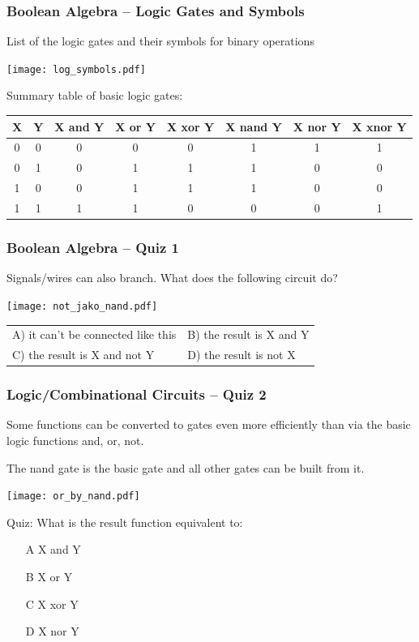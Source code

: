 \documentclass{beamer}
\begin{document}
\begin{frame}
\frametitle{Boolean Algebra -- Logic Gates and Symbols}

List of the logic gates and their symbols for binary operations
\begin{center}
   \texttt{[image: log\_symbols.pdf]}
\end{center}

Summary table of basic logic gates:
\begin{tabular}{|c|c|c|c|c|c|c|c|}\hline
X & Y & X and Y & X or Y & X xor Y & X nand Y & X nor Y & X xnor Y \\\hline
0 & 0 &    0    &   0    &    0    &     1    &    1    &    1     \\\hline
0 & 1 &    0    &   1    &    1    &     1    &    0    &    0     \\\hline
1 & 0 &    0    &   1    &    1    &     1    &    0    &    0     \\\hline
1 & 1 &    1    &   1    &    0    &     0    &    0    &    1     \\\hline
\end{tabular}

\end{frame}


\begin{frame}
\frametitle{Boolean Algebra -- Quiz 1}

Signals/wires can also branch. What does the following circuit do?
\begin{center}
   \texttt{[image: not\_jako\_nand.pdf]}
\end{center}

\begin{tabular}{ll}
A) it can't be connected like this \phantom{XXXX} & B) the result is X and Y\\
C) the result is X and not Y                     & D) the result is not X
\end{tabular}

\end{frame}


\begin{frame}
\frametitle{Logic/Combinational Circuits -- Quiz 2}

Some functions can be converted to gates even more efficiently than via the basic logic functions and, or, not.

The nand gate is the basic gate and all other gates can be built from it.

\begin{center}
   \texttt{[image: or\_by\_nand.pdf]}
\end{center}

Quiz: What is the result function equivalent to:
\begin{itemize}
\item[A] X and Y
\item[B] X or Y
\item[C] X xor Y
\item[D] X nor Y
\end{itemize}

\end{frame}
\end{document}
